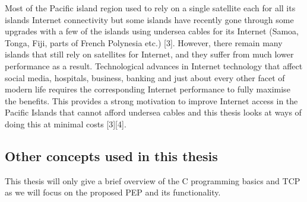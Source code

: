 \documentclass{uathesis}
\begin{document}
Most of the Pacific island region used to rely on a single satellite each for all its islands Internet connectivity but some islands have recently gone through some upgrades with a few of the islands using undersea cables for its Internet (Samoa, Tonga, Fiji, parts of French Polynesia etc.) [3]. However, there remain many islands that still rely on satellites for Internet, and they suffer from much lower performance as a result. Technological advances in Internet technology that affect social media, hospitals, business, banking  and just about every other facet of modern life requires the corresponding Internet performance to fully maximise the benefits. This provides a strong motivation to improve Internet access in the Pacific Islands that cannot afford undersea cables and this thesis looks at ways of doing this at minimal costs [3][4].


\subsection{Other concepts used in this thesis}
This thesis will only give a brief overview of the C programming basics and TCP as we will focus on the proposed PEP and its functionality. \\
\end{document}

